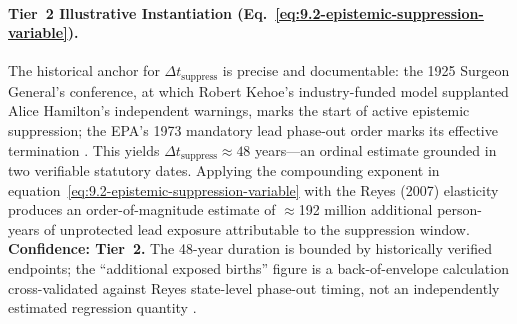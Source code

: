 \paragraph{Tier~2 Illustrative Instantiation (Eq.~\ref{eq:9.2-epistemic-suppression-variable}).}
The historical anchor for $\Delta t_{\text{suppress}}$ is precise and documentable: the 1925 Surgeon General's conference, at which Robert Kehoe's industry-funded model supplanted Alice Hamilton's independent warnings, marks the start of active epistemic suppression; the EPA's 1973 mandatory lead phase-out order marks its effective termination \cite{kitman_lead, reyes2007}. This yields $\Delta t_{\text{suppress}} \approx 48$ years---an ordinal estimate grounded in two verifiable statutory dates. Applying the compounding exponent in equation~\ref{eq:9.2-epistemic-suppression-variable} with the Reyes (2007) elasticity produces an order-of-magnitude estimate of $\approx$192 million additional person-years of unprotected lead exposure attributable to the suppression window. \textbf{Confidence: Tier~2.} The 48-year duration is bounded by historically verified endpoints; the ``additional exposed births'' figure is a back-of-envelope calculation cross-validated against Reyes state-level phase-out timing, not an independently estimated regression quantity \cite{aizer_currie}.

